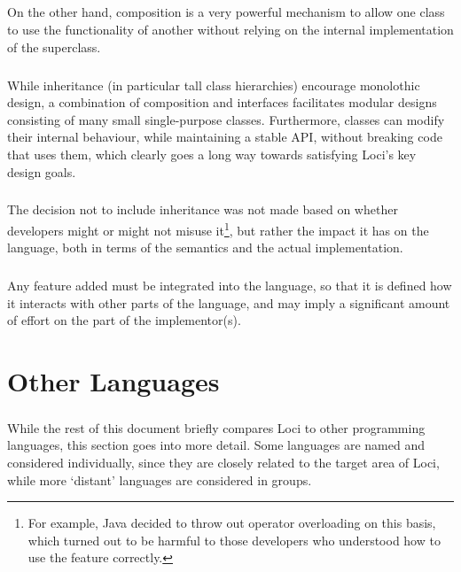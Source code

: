 \documentclass[12pt,twoside,notitlepage]{report}
\begin{document}
\paragraph{}
On the other hand, composition is a very powerful mechanism to allow one class to use the functionality of another without relying on the internal implementation of the superclass.

\paragraph{}
While inheritance (in particular tall class hierarchies) encourage monolothic design, a combination of composition and interfaces facilitates modular designs consisting of many small single-purpose classes. Furthermore, classes can modify their internal behaviour, while maintaining a stable API, without breaking code that uses them, which clearly goes a long way towards satisfying Loci's key design goals.

\paragraph{}
The decision not to include inheritance was not made based on whether developers might or might not misuse it\footnote{For example, Java decided to throw out operator overloading on this basis, which turned out to be harmful to those developers who understood how to use the feature correctly.}, but rather the impact it has on the language, both in terms of the semantics and the actual implementation.

\paragraph{}
Any feature added must be integrated into the language, so that it is defined how it interacts with other parts of the language, and may imply a significant amount of effort on the part of the implementor(s).

\cleardoublepage

\chapter{Other Languages}

\paragraph{}
While the rest of this document briefly compares Loci to other programming languages, this section goes into more detail. Some languages are named and considered individually, since they are closely related to the target area of Loci, while more `distant' languages are considered in groups.
\end{document}
